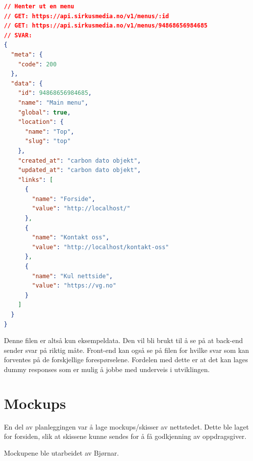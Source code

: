 \begin{lstlisting}[language=json]
// Henter ut en menu
// GET: https://api.sirkusmedia.no/v1/menus/:id
// GET: https://api.sirkusmedia.no/v1/menus/94868656984685
// SVAR:
{
  "meta": {
    "code": 200
  },
  "data": {
    "id": 94868656984685,
    "name": "Main menu",
    "global": true,
    "location": {
      "name": "Top",
      "slug": "top"
    },
    "created_at": "carbon dato objekt",
    "updated_at": "carbon dato objekt",
    "links": [
      {
        "name": "Forside",
        "value": "http://localhost/"
      },
      {
        "name": "Kontakt oss",
        "value": "http://localhost/kontakt-oss"
      },
      {
        "name": "Kul nettside",
        "value": "https://vg.no"
      }
    ]
  }
}
\end{lstlisting}

Denne filen er altså kun eksempeldata. Den vil bli brukt til å se på at back-end sender svar på riktig måte. Front-end kan også se på filen for hvilke svar som kan forventes på de forskjellige forespørselene. Fordelen med dette er at det kan lages dummy responses som er mulig å jobbe med underveis i utviklingen.


\section{Mockups}
En del av planleggingen var å lage mockups/skisser av nettstedet. Dette ble laget for forsiden, slik at skissene kunne sendes for å få godkjenning av oppdragsgiver.

Mockupene ble utarbeidet av Bjørnar. 


